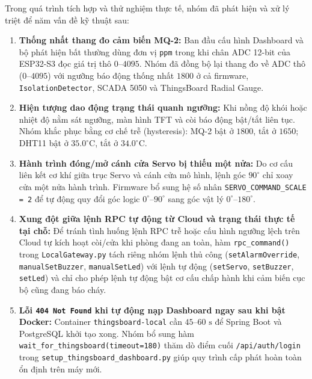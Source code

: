 Trong quá trình tích hợp và thử nghiệm thực tế, nhóm đã phát hiện và xử lý triệt để năm vấn đề kỹ thuật sau:
\begin{enumerate}[leftmargin=*, itemsep=2pt]
  \item \textbf{Thống nhất thang đo cảm biến MQ-2:} Ban đầu cấu hình Dashboard và bộ phát hiện bất thường dùng đơn vị \texttt{ppm} trong khi chân ADC 12-bit của ESP32-S3 đọc giá trị thô $0$--$4095$. Nhóm đã đồng bộ lại thang đo về ADC thô ($0$--$4095$) với ngưỡng báo động thống nhất $1800$ ở cả firmware, \texttt{IsolationDetector}, SCADA 5050 và ThingsBoard Radial Gauge.
  \item \textbf{Hiện tượng dao động trạng thái quanh ngưỡng:} Khi nồng độ khói hoặc nhiệt độ nằm sát ngưỡng, màn hình TFT và còi báo động bật/tắt liên tục. Nhóm khắc phục bằng cơ chế trễ (hysteresis): MQ-2 bật ở $1800$, tắt ở $1650$; DHT11 bật ở $35.0^\circ\text{C}$, tắt ở $34.0^\circ\text{C}$.
  \item \textbf{Hành trình đóng/mở cánh cửa Servo bị thiếu một nửa:} Do cơ cấu liên kết cơ khí giữa trục Servo và cánh cửa mô hình, lệnh góc $90^\circ$ chỉ xoay cửa một nửa hành trình. Firmware bổ sung hệ số nhân \texttt{SERVO\_COMMAND\_SCALE = 2} để tự động quy đổi góc logic $0^\circ$--$90^\circ$ sang góc vật lý $0^\circ$--$180^\circ$.
  \item \textbf{Xung đột giữa lệnh RPC tự động từ Cloud và trạng thái thực tế tại chỗ:} Để tránh tình huống lệnh RPC trễ hoặc cấu hình ngưỡng lệch trên Cloud tự kích hoạt còi/cửa khi phòng đang an toàn, hàm \texttt{rpc\_command()} trong \texttt{LocalGateway.py} tách riêng nhóm lệnh thủ công (\texttt{setAlarmOverride}, \texttt{manualSetBuzzer}, \texttt{manualSetLed}) với lệnh tự động (\texttt{setServo}, \texttt{setBuzzer}, \texttt{setLed}) và chỉ cho phép lệnh tự động bật cơ cấu chấp hành khi cảm biến cục bộ cũng đang báo cháy.
  \item \textbf{Lỗi \texttt{404 Not Found} khi tự động nạp Dashboard ngay sau khi bật Docker:} Container \texttt{thingsboard-local} cần $45$--$60\text{ s}$ để Spring Boot và PostgreSQL khởi tạo xong. Nhóm bổ sung hàm \texttt{wait\_for\_thingsboard(timeout=180)} thăm dò điểm cuối \texttt{/api/auth/login} trong \texttt{setup\_thingsboard\_dashboard.py} giúp quy trình cấp phát hoàn toàn ổn định trên máy mới.
\end{enumerate}
